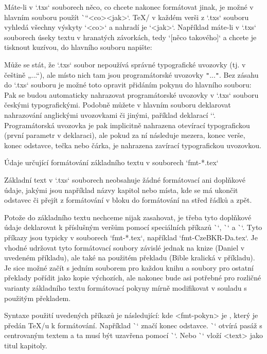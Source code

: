 Máte-li v `.txs` souborech něco, co chcete nakonec formátovat jinak, je možné
v hlavním souboru použít \`\cnvtext``{<co>}{<jak>}`. \TeX/ v každém verši z
`.txs` souboru vyhledá všechny výskyty `<co>` a nahradí je `<jak>`.
Například máte-li v `.txs` souborech úseky textu v hranatých závorkách, tedy
`[něco takového]` a chcete je tisknout kuzívou, do hlavního souboru napište:
\begtt
\cnvtext{[}{\bgroup\it}  \cnvtext{]}{\/\egroup}
\endtt

Může se stát, že `.txs` soubor nepoužívá správné typografické uvozovky (tj. v
češtině „...“), ale místo nich tam jsou programátorské uvozovky {\tt"}...{\tt"}. 
Bez zásahu do `.txs` souboru je možné toto opravit přidáním pokynu do
hlavního souboru:
\begtt
{}
\endtt
Pak se budou automaticky nahrazovat programátorské uvozovky v `.txs` souboru českými
typografickými. Podobně můžete v hlavním souboru deklarovat nahrazování
anglickými uvozovkami či jinými, paříklad deklarací
``.
Programátorská uvozovka je pak implicitně
nahrazena otevírací typografickou (první parametr v deklaraci), ale pokud za
ní následuje mezera, konec verše, konec odstavce, tečka nebo čárka, je
nahrazena zavírací typografickou uvozovkou.

\secc[fmt] Údaje určující formátování základního textu v souborech `fmt-*.tex`

Základní text v `.txs` souborech neobsahuje
žádné formátovací ani doplňkové údaje, jakými jsou například názvy kapitol
nebo místa, kde se má ukončit odstavec či přejít z formátování v bloku do
formátování na střed řádků a zpět.

Potože do základního textu nechceme nijak zasahovat, je třeba tyto doplňkové
údaje deklarovat k příslušným veršům pomocí speciálních příkazů \`\fmtadd`,
\`\fmtpre` a \`\fmtins`. Tyto příkazy jsou typicky v souborech `fmt-*.tex`,
například `fmt-CzeBKR-Da.tex`. Je vhodné udržovat tyto formátovací soubory
závislé jednak na knize (Daniel v uvedeném příkladu), ale také na použitém
překladu (Bible kralická v příkladu). Je sice možné začít s jedním souborem
pro každou knihu a soubory pro ostatní překlady pořídit jako kopie výchozích,
ale nakonec bude asi potřebné pro rozličné varianty základního textu
formátovací pokyny mírně modifikovat v souladu s použitým překladem.

Syntaxe použití uvedených příkazů je následující:
\begtt
{}
\endtt
kde <fmt-pokyn> je , který je předán \TeX/u k formátování.
Například \`\endgraf` značí konec odstavce. \`\begcenter` otvírá pasáž s
centrovaným textem a ta musí být uzavřena pomocí \`\endcenter`. Nebo 
\`` vloží <text> jako titul kapitoly.

